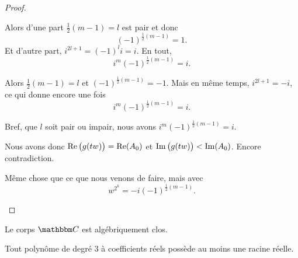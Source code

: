 \begin{proof}
\begin{subproof}
\begin{subproof}
\begin{subproof}
                        \item[Si \( l\) est pair]
                            Alors d'une part \( \frac{ 1 }{2}(m-1)=l\) est pair et donc 
                            \begin{equation}
                                (-1)^{\frac{ 1 }{2}(m-1)}=1.
                            \end{equation}
                            Et d'autre part, \( i^{2l+1}=(-1)^li=i\). En tout,
                            \begin{equation}
                                i^m(-1)^{\frac{ 1 }{2}(m-1)}=i.
                            \end{equation}
                        \item[Si \( l\) est impair]
                            Alors \( \frac{ 1 }{2}(m-1)=l\) et \( (-1)^{\frac{ 1 }{2}(m-1)}=-1\). Mais en même temps, \( i^{2l+1}=-i\), ce qui donne encore une fois
                            \begin{equation}
                                i^m(-1)^{\frac{ 1 }{2}(m-1)}=i.
                            \end{equation}
                    \end{subproof}
                    Bref, que \( l\) soit pair ou impair, nous avons \( i^m(-1)^{\frac{ 1 }{2}(m-1)}=i\).
            \end{subproof}
            Nous avons donc \( \operatorname{Re}\big( g(tw) \big)=\operatorname{Re}(A_0)\) et \( \operatorname{Im}\big( g(tw) \big)<\operatorname{Im}(A_0)\). Encore contradiction.
                \item[Si \( \imag(A_0)=0\)]
                    Même chose que ce que nous venons de faire, mais avec
                    \begin{equation}
                        w^{2^k}=-i(-1)^{\frac{ 1 }{2}(m-1)}.
                    \end{equation}
    \end{subproof}
\end{proof}

\begin{corollary}
    Le corps $\eC$ est algébriquement clos.
\end{corollary}

\begin{corollary}       \label{CORooKKNWooWEQukb}
    Tout polynôme de degré \( 3\) à coefficients réels possède au moins une racine réelle.
\end{corollary}

